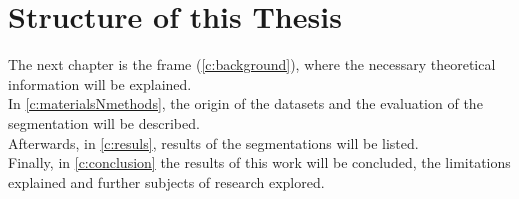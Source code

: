 \section{Structure of this Thesis}\label{s:introduction-structureofthisthesis}
The next chapter is the frame (\cref{c:background}), where the necessary theoretical information will be explained.\\
In \cref{c:materialsNmethods}, the origin of the datasets and the evaluation of the segmentation will be described.\\
Afterwards, in \cref{c:resuls}, results of the segmentations will be listed.\\
Finally, in \cref{c:conclusion} the results of this work will be concluded,
the limitations explained and further subjects of research explored.
